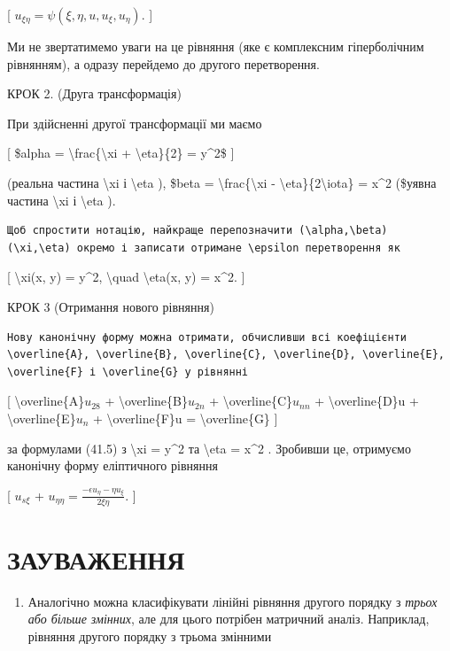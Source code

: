 \documentclass[
]{article}
\providecommand{\tightlist}{%
  \setlength{\itemsep}{0pt}\setlength{\parskip}{0pt}}
\begin{document}
{{{{[} \(u_{\xi\eta} = \psi(\xi, \eta, u, u_{\xi}, u_{\eta})\). {]}

Ми не звертатимемо уваги на це рівняння (яке є комплексним гіперболічним
рівнянням), а одразу перейдемо до другого перетворення.

КРОК 2. (Друга трансформація)

При здійсненні другої трансформації ми маємо

{[} \$alpha = \textbackslash frac\{\textbackslash xi +
\textbackslash eta\}\{2\} = y\^{}2\$ {]}

(реальна частина \textbackslash xi і \textbackslash eta ), \$beta =
\textbackslash frac\{\textbackslash xi -
\textbackslash eta\}\{2\textbackslash iota\} = x\^{}2 (\$уявна частина
\textbackslash xi і \textbackslash eta ).

\begin{verbatim}
Щоб спростити нотацію, найкраще перепозначити (\alpha,\beta) (\xi,\eta) окремо і записати отримане \epsilon перетворення як
\end{verbatim}

{[} \textbackslash xi(x, y) = y\^{}2, \textbackslash quad
\textbackslash eta(x, y) = x\^{}2. {]}

КРОК 3 (Отримання нового рівняння)

\begin{verbatim}
Нову канонічну форму можна отримати, обчисливши всі коефіцієнти \overline{A}, \overline{B}, \overline{C}, \overline{D}, \overline{E}, \overline{F} і \overline{G} у рівнянні
\end{verbatim}

{[} \textbackslash overline\{A\}\(u_{28}\) +
\textbackslash overline\{B\}\(u_{2n}\) +
\textbackslash overline\{C\}\(u_{nn}\) + \textbackslash overline\{D\}u +
\textbackslash overline\{E\}\(u_{n}\) + \textbackslash overline\{F\}u =
\textbackslash overline\{G\} {]}

за формулами (41.5) з \textbackslash xi = y\^{}2 та \textbackslash eta =
x\^{}2 . Зробивши це, отримуємо канонічну форму еліптичного рівняння

{[} \(u_{s\xi}\) +
\(u_{\eta\eta} = \frac{-\epsilon u_{\eta} - \eta u_{\xi}}{2\xi\eta}\).
{]}

\section{ЗАУВАЖЕННЯ}\label{ux437ux430ux443ux432ux430ux436ux435ux43dux43dux44f-5}

\begin{enumerate}
\def\labelenumi{\arabic{enumi}.}
\tightlist
\item
  Аналогічно можна класифікувати лінійні рівняння другого порядку з
  \emph{трьох або більше змінних}, але для цього потрібен матричний
  аналіз. Наприклад, рівняння другого порядку з трьома змінними
\end{enumerate}

}}}
\end{document}
